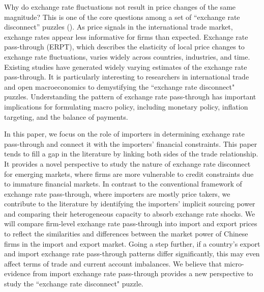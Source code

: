 \documentclass[12pt]{article}
\begin{document}
Why do exchange rate fluctuations not result in price changes of the same magnitude? This is one of the core questions among a set of ``exchange rate disconnect'' puzzles (\cite{obstfeld2000}). As price signals in the international trade market, exchange rates appear less informative for firms than expected. Exchange rate pass-through (ERPT), which describes the elasticity of local price changes to exchange rate fluctuations, varies widely across countries, industries, and time. Existing studies have generated widely varying estimates of the exchange rate pass-through. It is particularly interesting to researchers in international trade and open macroeconomics to demystifying the ``exchange rate disconnect" puzzles. Understanding the pattern of exchange rate pass-through has important implications for formulating macro policy, including monetary policy, inflation targeting, and the balance of payments.

In this paper, we focus on the role of importers in determining exchange rate pass-through and connect it with the importers' financial constraints. This paper tends to fill a gap in the literature by linking both sides of the trade relationship. It provides a novel perspective to study the nature of exchange rate disconnect for emerging markets, where firms are more vulnerable to credit constraints due to immature financial markets. In contrast to the conventional framework of exchange rate pass-through, where importers are mostly price takers, we contribute to the literature by identifying the importers' implicit sourcing power and comparing their heterogeneous capacity to absorb exchange rate shocks. We will compare firm-level exchange rate pass-through into import and export prices to reflect the similarities and differences between the market power of Chinese firms in the import and export market. Going a step further, if a country's export and import exchange rate pass-through patterns differ significantly, this may even affect terms of trade and current account imbalances. We believe that micro-evidence from import exchange rate pass-through provides a new perspective to study the ``exchange rate disconnect" puzzle.
\end{document}
